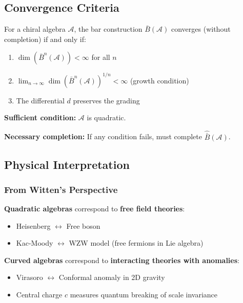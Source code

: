 \subsection{Convergence Criteria}

\begin{theorem}\label{thm:bar-convergence}
For a chiral algebra $\mathcal{A}$, the bar construction $\bar{B}(\mathcal{A})$ converges 
(without completion) if and only if:
\begin{enumerate}
\item $\dim(\bar{B}^n(\mathcal{A})) < \infty$ for all $n$
\item $\lim_{n \to \infty} \dim(\bar{B}^n(\mathcal{A}))^{1/n} < \infty$ (growth condition)
\item The differential $d$ preserves the grading
\end{enumerate}

\textbf{Sufficient condition:} $\mathcal{A}$ is quadratic.

\textbf{Necessary completion:} If any condition fails, must complete $\widehat{\bar{B}}(\mathcal{A})$.
\end{theorem}

\subsection{Physical Interpretation}

\subsubsection{From Witten's Perspective}

\textbf{Quadratic algebras} correspond to \textbf{free field theories}:
\begin{itemize}
\item Heisenberg $\leftrightarrow$ Free boson
\item Kac-Moody $\leftrightarrow$ WZW model (free fermions in Lie algebra)
\end{itemize}

\textbf{Curved algebras} correspond to \textbf{interacting theories with anomalies}:
\begin{itemize}
\item Virasoro $\leftrightarrow$ Conformal anomaly in 2D gravity
\item Central charge $c$ measures quantum breaking of scale invariance
\end{itemize}

